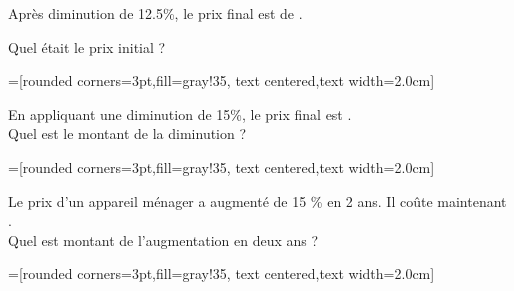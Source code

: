 \documentclass[main.tex]{subfiles}
\begin{document}
\begin{exercise} \hfill 
	
		\noindent\parbox{0.70\linewidth}{
	Après diminution de 12.5\%, le prix final est de . 
	
	Quel était le prix initial ?
	 }\parbox{0.23\linewidth}{
	=[rounded corners=3pt,fill=gray!35, text centered,text width=2.0cm]
}
\end{exercise} 
\begin{exercise} \hfill 
	
 		\noindent\parbox{0.70\linewidth}{
	En appliquant une diminution de 15\%, le prix final est . \\
Quel est le montant de la diminution ?  
 }\parbox{0.23\linewidth}{
 	=[rounded corners=3pt,fill=gray!35, text centered,text width=2.0cm]
 }
\end{exercise}  
\begin{exercise}\hfill 
 
\noindent\parbox{0.70\linewidth}{
Le prix d’un appareil ménager a augmenté de 15 \% en 2 ans. Il coûte maintenant .\\
 Quel est montant de l'augmentation en deux ans ? 
}\parbox{0.23\linewidth}{
	=[rounded corners=3pt,fill=gray!35, text centered,text width=2.0cm]
}
\end{exercise}
\end{document}
